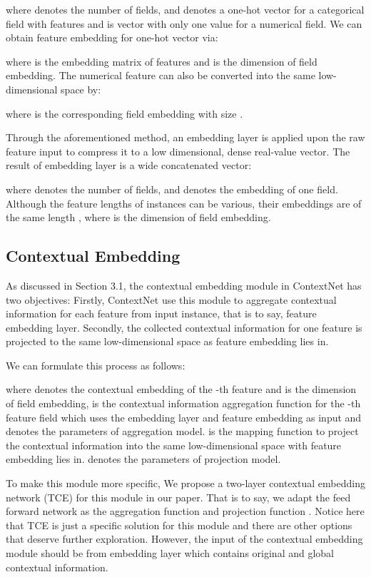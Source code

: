 \documentclass[sigconf]{acmart}
\begin{document}
where  denotes the number of fields, and  denotes a one-hot vector for a categorical  field with  features and  is vector with only one value for a numerical  field. We can obtain feature embedding  for one-hot vector  via:

where  is the embedding matrix of  features and  is the dimension of field embedding. The numerical feature  can also be converted into the same low-dimensional space by:

where  is the corresponding field embedding with size .


Through the aforementioned method, an embedding layer is applied upon the raw feature input to compress it to a low dimensional, dense real-value vector. The result of embedding layer is a wide concatenated vector:


where  denotes the number of fields, and  denotes the embedding of one field. Although the feature lengths of instances can be various, their embeddings are of the same length , where  is the dimension of field embedding.

\subsection{Contextual Embedding}
As discussed in Section 3.1, the contextual embedding module in ContextNet has two objectives: Firstly, ContextNet use this module  to aggregate contextual information for each feature from input instance, that is to say, feature embedding layer. Secondly, the collected contextual information for one feature is projected to the same low-dimensional space as feature embedding lies in.


 We can formulate this process as  follows:


where   denotes the contextual embedding of the -th feature  and  is the dimension of field embedding,  is the contextual information aggregation function for the -th feature field which uses the embedding layer  and feature embedding  as input and  denotes the parameters of aggregation model.  is the mapping function to project the contextual information into the same low-dimensional space with feature embedding lies in.  denotes the parameters of projection model.


To make this module more specific, We propose a  two-layer contextual embedding network (TCE) for this module in our paper. That is to say, we adapt the feed forward network as the aggregation function  and projection function . Notice here that TCE is just a specific solution for this module and there are other options  that deserve further exploration. However, the input of the contextual embedding module should be from embedding layer which contains original and global contextual information.
\end{document}
